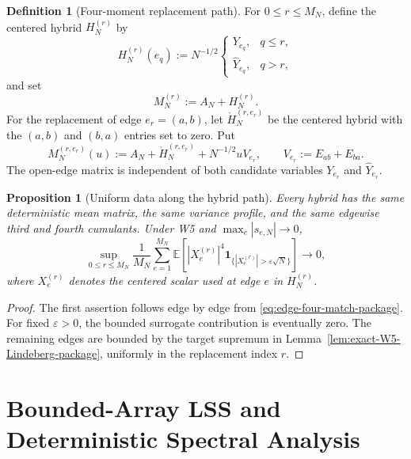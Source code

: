 \documentclass[11pt]{article}
\newtheorem{proposition}[theorem]{Proposition}
\theoremstyle{definition}
\newtheorem{definition}[theorem]{Definition}
\theoremstyle{remark}
\newcommand{\E}{\mathbb E}
\newcommand{\one}{\mathbf 1}
\begin{document}
\begin{definition}[Four-moment replacement path]
\label{def:hybrid-package}
For $0\le r\le M_N$, define the centered hybrid $H_N^{(r)}$ by
\begin{equation}\label{eq:hybrid-entry-package}
 H_N^{(r)}(e_q)
 :=N^{-1/2}
 \begin{cases}
 Y_{e_q},&q\le r,\\
 \widehat Y_{e_q},&q>r,
 \end{cases}
\end{equation}
and set
\begin{equation}\label{eq:full-hybrid-package}
 M_N^{(r)}:=A_N+H_N^{(r)}.
\end{equation}
For the replacement of edge $e_r=(a,b)$, let
$\mathring H_N^{(r,e_r)}$ be the centered hybrid with the $(a,b)$ and
$(b,a)$ entries set to zero.  Put
\begin{equation}\label{eq:open-edge-package}
 M_N^{(r,e_r)}(u)
 :=A_N+\mathring H_N^{(r,e_r)}+N^{-1/2}uV_{e_r},
 \qquad
 V_{e_r}:=E_{ab}+E_{ba}.
\end{equation}
The open-edge matrix is independent of both candidate variables
$Y_{e_r}$ and $\widehat Y_{e_r}$.
\end{definition}

\begin{proposition}[Uniform data along the hybrid path]
\label{prop:hybrid-data-package}
Every hybrid has the same deterministic mean matrix, the same variance
profile, and the same edgewise third and fourth cumulants.  Under W5 and
$\max_e|s_{e,N}|\to0$,
\begin{equation}\label{eq:uniform-hybrid-Lindeberg-package}
 \sup_{0\le r\le M_N}
 \frac1{M_N}\sum_{e=1}^{M_N}
 \E\left[
 |X_e^{(r)}|^4
 \one_{\{|X_e^{(r)}|>\varepsilon\sqrt N\}}
 \right]\longrightarrow0,
\end{equation}
where $X_e^{(r)}$ denotes the centered scalar used at edge $e$ in
$H_N^{(r)}$.
\end{proposition}

\begin{proof}
The first assertion follows edge by edge from
\eqref{eq:edge-four-match-package}.  For fixed $\varepsilon>0$, the bounded
surrogate contribution is eventually zero.  The remaining edges are bounded
by the target supremum in Lemma~\ref{lem:exact-W5-Lindeberg-package}, uniformly
in the replacement index $r$.
\end{proof}

\section{Bounded-Array LSS and Deterministic Spectral Analysis}
\label{sec:R3-package}
\end{document}
